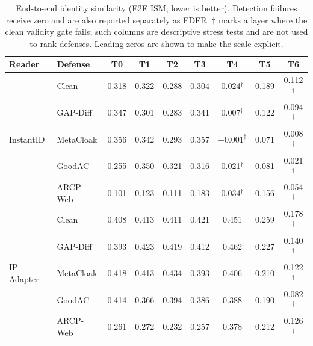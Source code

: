 \begin{table}[t]
\centering
\caption{End-to-end identity similarity (E2E ISM; lower is better). Detection
failures receive zero and are also reported separately as FDFR. $\dagger$
marks a layer where the clean validity gate fails; such columns are descriptive
stress tests and are not used to rank defenses. Leading zeros are shown to make
the scale explicit.}
\label{tab:web4-e2e}
\small
\renewcommand{\arraystretch}{1.18}
\setlength{\tabcolsep}{7pt}
\begin{tabular}{llccccccc}
\toprule
Reader & Defense & T0 & T1 & T2 & T3 & T4 & T5 & T6 \\
\midrule
\multirow{5}{*}{InstantID}
& Clean & 0.318 & 0.322 & 0.288 & 0.304 & 0.024$^\dagger$ & 0.189 & 0.112$^\dagger$ \\
& GAP-Diff & 0.347 & 0.301 & 0.283 & 0.341 & 0.007$^\dagger$ & 0.122 & 0.094$^\dagger$ \\
& MetaCloak & 0.356 & 0.342 & 0.293 & 0.357 & $-0.001^\dagger$ & 0.071 & 0.008$^\dagger$ \\
& GoodAC & 0.255 & 0.350 & 0.321 & 0.316 & 0.021$^\dagger$ & 0.081 & 0.021$^\dagger$ \\
& ARCP-Web & 0.101 & 0.123 & 0.111 & 0.183 & 0.034$^\dagger$ & 0.156 & 0.054$^\dagger$ \\
\midrule
\multirow{5}{*}{IP-Adapter}
& Clean & 0.408 & 0.413 & 0.411 & 0.421 & 0.451 & 0.259 & 0.178$^\dagger$ \\
& GAP-Diff & 0.393 & 0.423 & 0.419 & 0.412 & 0.462 & 0.227 & 0.140$^\dagger$ \\
& MetaCloak & 0.418 & 0.413 & 0.434 & 0.393 & 0.406 & 0.210 & 0.122$^\dagger$ \\
& GoodAC & 0.414 & 0.366 & 0.394 & 0.386 & 0.388 & 0.190 & 0.082$^\dagger$ \\
& ARCP-Web & 0.261 & 0.272 & 0.232 & 0.257 & 0.378 & 0.212 & 0.126$^\dagger$ \\
\bottomrule
\end{tabular}
\end{table}

